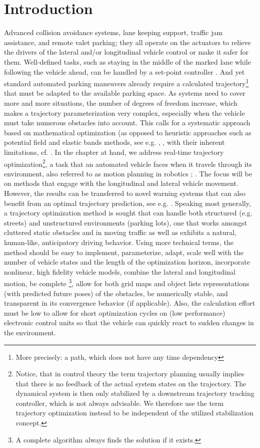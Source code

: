 \section{Introduction}\label{S:Intro}

Advanced collision avoidance systems, lane keeping support, traffic jam assistance, and remote valet parking; they all operate on the actuators to relieve the drivers of the lateral and/or longitudinal vehicle control or make it safer for them. Well-defined tasks, such as staying in the middle of the marked lane while following the vehicle ahead, can be handled by a set-point controller \cite{handbuchFAS_Gayko2012}. And yet standard automated parking maneuvers already require a calculated trajectory\footnote{More precisely: a path, which does not have any time dependency} that must be adapted to the available parking space. As systems need to cover more and more situations, the number of degrees of freedom increase, which makes a trajectory parameterization very complex, especially when the vehicle must take numerous obstacles into account. This calls for a systematic approach based on mathematical optimization (as opposed to heuristic approaches such as potential field and elastic bands methods, see e.g. \cite{krogh1984generalized}, \cite{Brandt2008}, with their inherent limitations, cf. \cite{koren1991potential}.
In the chapter at hand, we address real-time trajectory optimization\footnote{Notice, that in control theory the term trajectory planning usually implies that there is no feedback of the actual system states on the trajectory. The dynamical system is then only stabilized by a downstream trajectory tracking controller, which is not always advisable. We therefore use the term trajectory optimization instead to be independent of the utilized stabilization concept.}, a task that an automated vehicle faces when it travels through its environment, also referred to as motion planning in robotics \cite{latombe1990robot}; \cite{lavalle2006pa}. The focus will be on methods that engage with the longitudinal and lateral vehicle movement. However, the results can be transferred to novel warning systems that can also
benefit from an optimal trajectory prediction, see e.g. \cite{eichhorn2013Maneuverprediction}. 
Speaking most generally, a trajectory optimization method is sought that can handle both structured (e.g. streets) and unstructured environments (parking lots), one that works amongst cluttered static obstacles and in moving traffic as well as exhibits a natural, human-like, anticipatory driving behavior.
Using more technical terms, the method should be easy to implement, parameterize, adapt, scale well with the number of vehicle states and the length of the optimization horizon, incorporate nonlinear, high fidelity vehicle models, combine the lateral and longitudinal motion, be complete \footnote{A complete algorithm always finds the solution if it exists.}, allow for both grid maps and object lists representations (with predicted future poses) of the obstacles, be numerically stable, and transparent in its convergence behavior (if applicable). Also, the calculation effort must be low to allow for short optimization cycles on (low performance) electronic control units so that the vehicle can quickly react to sudden changes in the environment.
